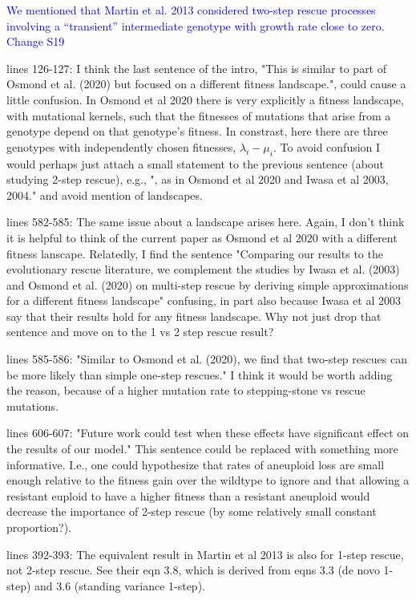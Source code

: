 \documentclass[12pt]{extarticle}
\begin{document}
\textcolor{blue}{We mentioned that Martin et al. 2013 considered two-step rescue processes involving a ``transient'' intermediate genotype with growth rate close to zero. Change S19}

lines 126-127: I think the last sentence of the intro, "This is similar to part of Osmond et al. (2020) but focused on a different fitness landscape.", could cause a little confusion. In Osmond et al 2020 there is very explicitly a fitness landscape, with mutational kernels, such that the fitnesses of mutations that arise from a genotype depend on that genotype's fitness. In constrast, here there are three genotypes with independently chosen fitnesses, $\lambda_i - \mu_i$. To avoid confusion I would perhaps just attach a small statement to the previous sentence (about studying 2-step rescue), e.g., ", as in Osmond et al 2020 and Iwasa et al 2003, 2004." and avoid mention of landscapes.

lines 582-585: The same issue about a landscape arises here. Again, I don't think it is helpful to think of the current paper as Osmond et al 2020 with a different fitness lanscape. Relatedly, I find the sentence "Comparing our results to the evolutionary rescue literature, we complement the studies by Iwasa et al. (2003) and Osmond et al. (2020) on multi-step rescue by deriving simple approximations for a different fitness landscape" confusing, in part also because Iwasa et al 2003 say that their results hold for any fitness landscape. Why not just drop that sentence and move on to the 1 vs 2 step rescue result?

lines 585-586: "Similar to Osmond et al. (2020), we find that two-step rescues can be more likely than simple one-step rescues." I think it would be worth adding the reason, because of a higher mutation rate to stepping-stone vs rescue mutations.

lines 606-607: "Future work could test when these effects have significant effect on the results of our model." This sentence could be replaced with something more informative. I.e., one could hypothesize that rates of aneuploid loss are small enough relative to the fitness gain over the wildtype to ignore and that allowing a resistant euploid to have a higher fitness than a resistant aneuploid would decrease the importance of 2-step rescue (by some relatively small constant proportion?).

lines 392-393: The equivalent result in Martin et al 2013 is also for 1-step rescue, not 2-step rescue. See their eqn 3.8, which is derived from eqns 3.3 (de novo 1-step) and 3.6 (standing variance 1-step).
\end{document}
